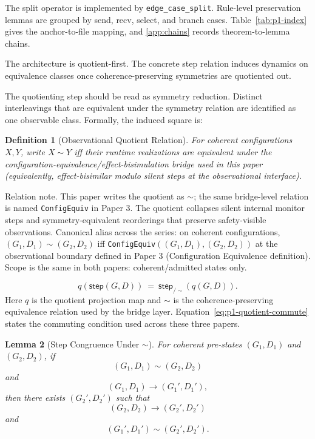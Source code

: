 \documentclass[a4paper,10pt,twocolumn,english]{article}
\numberwithin{equation}{section}
\theoremstyle{paperdef}
\newtheorem{definition}{Definition}[section]
\theoremstyle{paperplain}
\newtheorem{lemma}[definition]{Lemma}
\theoremstyle{paperdef}
\theoremstyle{paperremark}
\begin{document}
The split operator is implemented by \nolinkurl{edge_case_split}. Rule-level preservation lemmas are grouped by send, recv, select, and branch cases. Table~\ref{tab:p1-index} gives the anchor-to-file mapping, and \cref{app:chains} records theorem-to-lemma chains.

The architecture is quotient-first. The concrete step relation induces dynamics on equivalence classes once coherence-preserving symmetries are quotiented out.

The quotienting step should be read as symmetry reduction. Distinct interleavings that are equivalent under the symmetry relation are identified as one observable class. Formally, the induced square is:
\begin{definition}[Observational Quotient Relation]
	For coherent configurations $X,Y$, write $X\sim Y$ iff their runtime
	realizations are equivalent under the configuration-equivalence/effect-bisimulation
	bridge used in this paper (equivalently, effect-bisimilar modulo silent steps
	at the observational interface).
\end{definition}
\noindent
Relation note. This paper writes the quotient as $\sim$; the same bridge-level
relation is named \texttt{ConfigEquiv} in Paper 3. The quotient collapses silent
internal monitor steps and symmetry-equivalent reorderings that preserve
safety-visible observations.
Canonical alias across the series: on coherent configurations, $(G_1,D_1)\sim
	(G_2,D_2)$ iff \texttt{ConfigEquiv}$((G_1,D_1),(G_2,D_2))$ at the observational
boundary defined in Paper 3 (Configuration Equivalence definition). Scope is
the same in both papers: coherent/admitted states only.

\noindent
\vspace{-2pt}
\begin{equation}
	\label{eq:p1-quotient-commute}
	q(\mathsf{step}(G,D))\ =\ \mathsf{step}_{/ \sim}(q(G,D)).
\end{equation}
Here $q$ is the quotient projection map and $\sim$ is the coherence-preserving equivalence relation used by the bridge layer.
Equation~\ref{eq:p1-quotient-commute} states the commuting condition used across these three papers.

\begin{lemma}[Step Congruence Under $\sim$]
	\label{lem:p1-quotient-congruence}
	For coherent pre-states $(G_1,D_1)$ and $(G_2,D_2)$, if
	\[
		(G_1,D_1)\sim(G_2,D_2)
	\]
	and
	\[
		(G_1,D_1)\to(G_1',D_1'),
	\]
	then there exists $(G_2',D_2')$ such that
	\[
		(G_2,D_2)\to(G_2',D_2')
	\]
	and
	\[
		(G_1',D_1')\sim(G_2',D_2').
	\]
\end{lemma}
\end{document}
